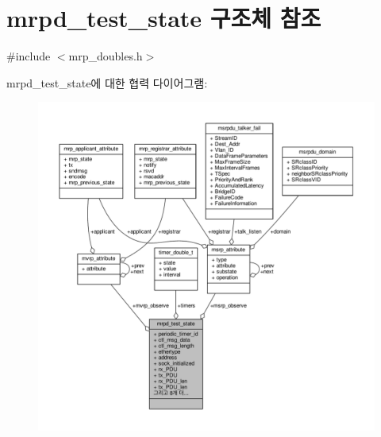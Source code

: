 \hypertarget{structmrpd__test__state}{}\section{mrpd\+\_\+test\+\_\+state 구조체 참조}
\label{structmrpd__test__state}


{\ttfamily \#include $<$mrp\+\_\+doubles.\+h$>$}



mrpd\+\_\+test\+\_\+state에 대한 협력 다이어그램\+:
\nopagebreak
\begin{figure}[H]
\begin{center}
\leavevmode
\includegraphics[width=350pt]{structmrpd__test__state__coll__graph}
\end{center}
\end{figure}
